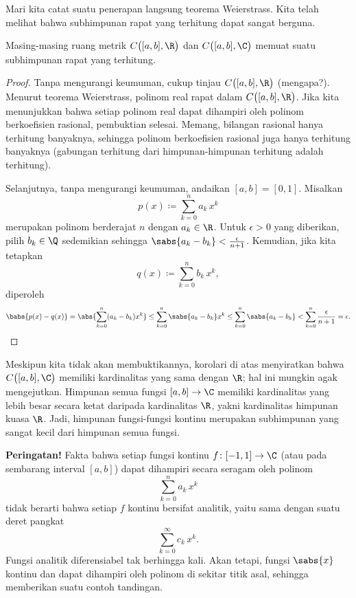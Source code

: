 Mari kita catat suatu penerapan langsung teorema Weierstrass. Kita telah
melihat bahwa subhimpunan rapat yang terhitung dapat sangat berguna.

\begin{cor}
Masing-masing ruang metrik $C\bigl([a,b],\R\bigr)$ dan $C\bigl([a,b],\C\bigr)$ memuat suatu subhimpunan rapat yang terhitung.
\end{cor}

\begin{proof}
Tanpa mengurangi keumuman, cukup tinjau
$C\bigl([a,b],\R\bigr)$
(mengapa?).
Menurut teorema Weierstrass, polinom real rapat dalam $C\bigl([a,b],\R\bigr)$.
Jika kita menunjukkan bahwa
setiap polinom real dapat dihampiri oleh polinom berkoefisien
rasional, pembuktian selesai.
Memang, bilangan rasional hanya terhitung banyaknya, sehingga polinom
berkoefisien rasional juga hanya terhitung banyaknya (gabungan terhitung dari
himpunan-himpunan terhitung adalah terhitung).

Selanjutnya, tanpa mengurangi keumuman, andaikan $[a,b]=[0,1]$. Misalkan
\begin{equation*}
p(x) \coloneqq \sum_{k=0}^n a_k\,  x^k
\end{equation*}
merupakan polinom berderajat $n$ dengan $a_k \in \R$. Untuk $\epsilon > 0$
yang diberikan, pilih $b_k \in \Q$ sedemikian sehingga
$\sabs{a_k-b_k} < \frac{\epsilon}{n+1}$. Kemudian, jika kita tetapkan
\begin{equation*}
q(x) \coloneqq \sum_{k=0}^n b_k \, x^k ,
\end{equation*}
diperoleh
\begin{equation*}
\babs{p(x)-q(x)}
=
\abs{\sum_{k=0}^n (a_k-b_k) x^k}
\leq
\sum_{k=0}^n \sabs{a_k-b_k} x^k
\leq
\sum_{k=0}^n \sabs{a_k-b_k}
<
\sum_{k=0}^n \frac{\epsilon}{n+1} = \epsilon . \qedhere
\end{equation*}
\end{proof}

\begin{remark}
Meskipun kita tidak akan membuktikannya, korolari di atas menyiratkan bahwa
$C\bigl([a,b],\C\bigr)$ memiliki kardinalitas yang sama dengan $\R$; hal ini
mungkin agak mengejutkan. Himpunan semua fungsi $[a,b] \to \C$ memiliki
kardinalitas yang lebih besar secara ketat daripada kardinalitas $\R$, yakni
kardinalitas himpunan kuasa $\R$. Jadi, himpunan fungsi-fungsi kontinu
merupakan subhimpunan yang sangat kecil dari himpunan semua fungsi.
\end{remark}

\textbf{Peringatan!}
Fakta bahwa setiap fungsi kontinu $f \colon [-1,1] \to \C$ (atau pada sembarang
interval $[a,b]$) dapat dihampiri secara seragam oleh polinom
\begin{equation*}
\sum_{k=0}^n a_k\,  x^k
\end{equation*}
tidak berarti bahwa setiap $f$ kontinu bersifat analitik, yaitu sama dengan
suatu deret pangkat
\begin{equation*}
\sum_{k=0}^\infty c_k\,  x^k .
\end{equation*}
Fungsi analitik diferensiabel tak berhingga kali. Akan tetapi,
fungsi $\sabs{x}$ kontinu dan dapat dihampiri oleh polinom di sekitar titik asal,
sehingga memberikan suatu contoh tandingan.

